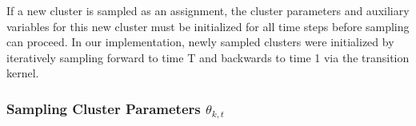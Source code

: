 \documentclass{article}
\begin{document}

If a new cluster is sampled as an assignment, the cluster parameters and auxiliary variables for this new cluster must be initialized for all time steps before sampling can proceed. In our implementation, newly sampled clusters were initialized by iteratively sampling forward to time T and backwards to time 1 via the transition kernel.



\subsubsection{Sampling Cluster Parameters $\theta_{k, t}$}
\end{document}
